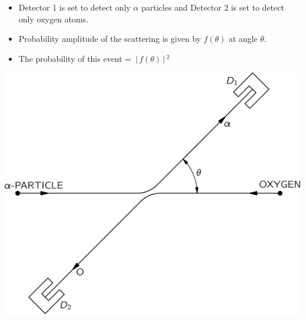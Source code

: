 \documentclass[aspectratio=169]{beamer}
\begin{document}
\begin{frame}

	\begin{multicols}{2}

		\begin{itemize}
			\item Detector 1 is set to detect only $ \alpha $ particles and Detector 2 is set to detect only oxygen atoms.\pause \newline
			\item Probability amplitude of the scattering is given by $ f(\theta)$ at angle $\theta$.\pause \newline
			\item The probability of this event = $ \,\rvert\,f(\theta) \,\rvert\,^{2} $
		\end{itemize}
		
	\columnbreak

\includegraphics[scale=0.45]{alpha-ox.png}

	\end{multicols}


\end{frame}
\end{document}
